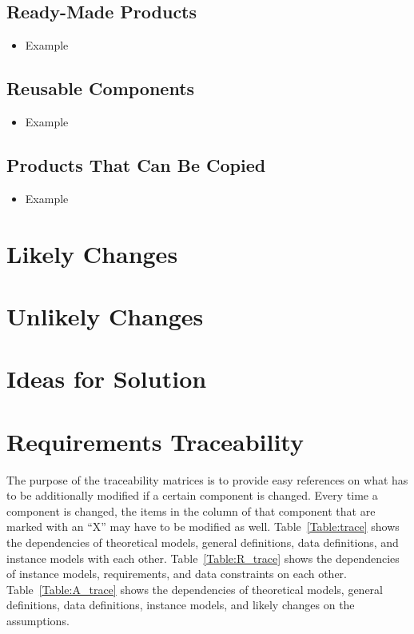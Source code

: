 \documentclass[12pt]{article}
\begin{document}
  \subsection{Ready-Made Products}
    \begin{itemize}
      \item Example
    \end{itemize}

  \subsection{Reusable Components}
    \begin{itemize}
      \item Example
    \end{itemize}

  \subsection{Products That Can Be Copied}
    \begin{itemize}
      \item Example
    \end{itemize}

\section{Likely Changes}    

\section{Unlikely Changes}    

\section{Ideas for Solution}

\section{Requirements Traceability}

The purpose of the traceability matrices is to provide easy references on what
has to be additionally modified if a certain component is changed.  Every time a
component is changed, the items in the column of that component that are marked
with an ``X'' may have to be modified as well.  Table~\ref{Table:trace} shows the
dependencies of theoretical models, general definitions, data definitions, and
instance models with each other. Table~\ref{Table:R_trace} shows the
dependencies of instance models, requirements, and data constraints on each
other. Table~\ref{Table:A_trace} shows the dependencies of theoretical models,
general definitions, data definitions, instance models, and likely changes on
the assumptions.
\end{document}
